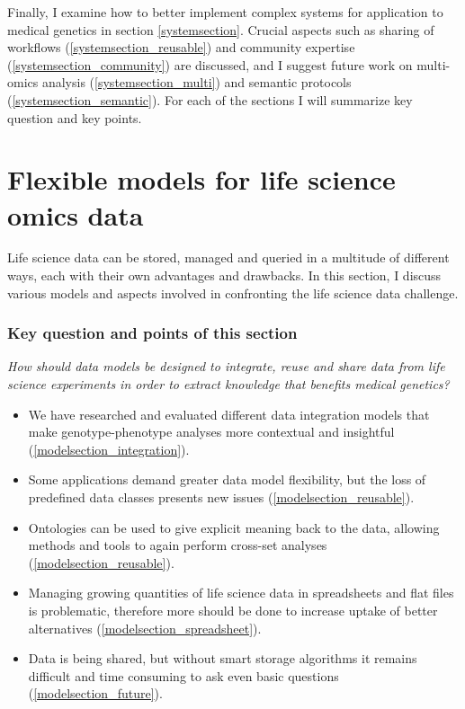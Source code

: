 Finally, I examine how to better implement complex systems for application to medical genetics in section \ref{systemsection}.
Crucial aspects such as sharing of workflows (\ref{systemsection_reusable}) and community expertise (\ref{systemsection_community}) are discussed, and I suggest future work on multi-omics analysis (\ref{systemsection_multi}) and semantic protocols (\ref{systemsection_semantic}).
For each of the sections I will summarize key question and key points.


\section{Flexible models for life science omics data} \label{modelsection}

Life science data can be stored, managed and queried in a multitude of different ways, each with their own advantages and drawbacks.
In this section, I discuss various models and aspects involved in confronting the life science data challenge.

\subsubsection*{Key question and points of this section}

\textsl{How should data models be designed to integrate, reuse and share data from life science experiments in order to extract knowledge that benefits medical genetics?}

\begin{tcolorbox}[width=\textwidth,colframe=deeporange,colback={white},title={Key points},colbacktitle=deeporange,coltitle=black,enhanced]
  \begin{itemize}
    \item We have researched and evaluated different data integration models that make genotype-phenotype analyses more contextual and insightful (\ref{modelsection_integration}).
    \item Some applications demand greater data model flexibility, but the loss of predefined data classes presents new issues (\ref{modelsection_reusable}).
    \item Ontologies can be used to give explicit meaning back to the data, allowing methods and tools to again perform cross-set analyses (\ref{modelsection_reusable}).
    \item Managing growing quantities of life science data in spreadsheets and flat files is problematic, therefore more should be done to increase uptake of better alternatives (\ref{modelsection_spreadsheet}).
    \item Data is being shared, but without smart storage algorithms it remains difficult and time consuming to ask even basic questions (\ref{modelsection_future}).
  \end{itemize}
\end{tcolorbox}


